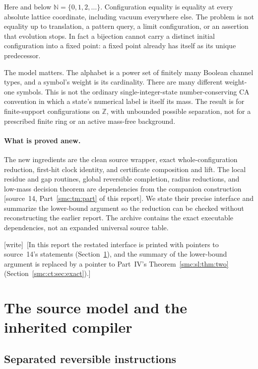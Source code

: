 \documentclass[11pt,letterpaper]{article}
\numberwithin{equation}{section}
\theoremstyle{definition}
\theoremstyle{remark}
\newcommand{\Z}{\mathbb Z}
\newcommand{\NN}{\mathbb N}
\newcommand{\wtag}{\textup{[write]}}
\begin{document}
Here and below $\NN=\{0,1,2,\ldots\}$. Configuration equality is equality at every absolute lattice coordinate, including vacuum everywhere else. The problem is not equality up to translation, a pattern query, a limit configuration, or an assertion that evolution stops. In fact a bijection cannot carry a distinct initial configuration into a fixed point: a fixed point already has itself as its unique predecessor.

The model matters. The alphabet is a power set of finitely many Boolean channel types, and a symbol's weight is its cardinality. There are many different weight-one symbols. This is not the ordinary single-integer-state number-conserving CA convention in which a state's numerical label is itself its mass. The result is for finite-support configurations on $\Z$, with unbounded possible separation, not for a prescribed finite ring or an active mass-free background.

\paragraph{What is proved anew.}
The new ingredients are the clean source wrapper, exact whole-configuration reduction, first-hit clock identity, and certificate composition and lift. The local residue and gap routines, global reversible completion, radius reductions, and low-mass decision theorem are dependencies from the companion construction \textup{[source~14, Part~\ref{smc:tm:part} of this report]}. We state their precise interface and summarize the lower-bound argument so the reduction can be checked without reconstructing the earlier report. The archive contains the exact executable dependencies, not an expanded universal source table.

\wtag\ [In this report the restated interface is printed with pointers to source~14's statements (Section~\ref{smc:ct:sec:interface}), and the summary of the lower-bound argument is replaced by a pointer to Part~IV's Theorem~\ref{smc:sl:thm:two} (Section~\ref{smc:ct:sec:exact}).]

\section{The source model and the inherited compiler}\label{smc:ct:sec:interface}

\subsection{Separated reversible instructions}
\end{document}
